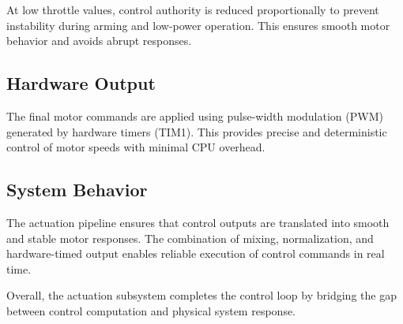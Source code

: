 At low throttle values, control authority is reduced proportionally to prevent instability during arming and low-power operation. This ensures smooth motor behavior and avoids abrupt responses.

\subsection{Hardware Output}

The final motor commands are applied using pulse-width modulation (PWM) generated by hardware timers (TIM1). This provides precise and deterministic control of motor speeds with minimal CPU overhead.

\subsection{System Behavior}

The actuation pipeline ensures that control outputs are translated into smooth and stable motor responses. The combination of mixing, normalization, and hardware-timed output enables reliable execution of control commands in real time.

Overall, the actuation subsystem completes the control loop by bridging the gap between control computation and physical system response.